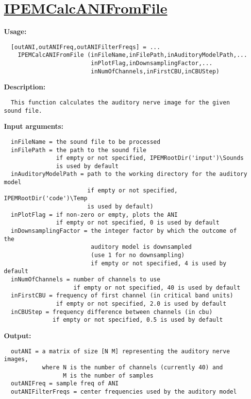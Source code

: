 \newpage
\section*{\hyperlink{Concepts:IPEMCalcANIFromFile}{IPEMCalcANIFromFile}}
\hypertarget{FuncRef:IPEMCalcANIFromFile}{}

\textbf{Usage:}
\begin{verbatim}  [outANI,outANIFreq,outANIFilterFreqs] = ...
    IPEMCalcANIFromFile (inFileName,inFilePath,inAuditoryModelPath,...
                         inPlotFlag,inDownsamplingFactor,...
                         inNumOfChannels,inFirstCBU,inCBUStep)

\end{verbatim}
\textbf{Description:}
\begin{verbatim}  This function calculates the auditory nerve image for the given sound file.

\end{verbatim}
\textbf{Input arguments:}
\begin{verbatim}  inFileName = the sound file to be processed
  inFilePath = the path to the sound file
               if empty or not specified, IPEMRootDir('input')\Sounds
               is used by default
  inAuditoryModelPath = path to the working directory for the auditory model
                        if empty or not specified, IPEMRootDir('code')\Temp
                        is used by default)
  inPlotFlag = if non-zero or empty, plots the ANI
               if empty or not specified, 0 is used by default
  inDownsamplingFactor = the integer factor by which the outcome of the
                         auditory model is downsampled
                         (use 1 for no downsampling)
                         if empty or not specified, 4 is used by default
  inNumOfChannels = number of channels to use
                    if empty or not specified, 40 is used by default
  inFirstCBU = frequency of first channel (in critical band units)
               if empty or not specified, 2.0 is used by default
  inCBUStep = frequency difference between channels (in cbu)
              if empty or not specified, 0.5 is used by default

\end{verbatim}
\textbf{Output:}
\begin{verbatim}  outANI = a matrix of size [N M] representing the auditory nerve images,
           where N is the number of channels (currently 40) and
                 M is the number of samples
  outANIFreq = sample freq of ANI
  outANIFilterFreqs = center frequencies used by the auditory model

\end{verbatim}
